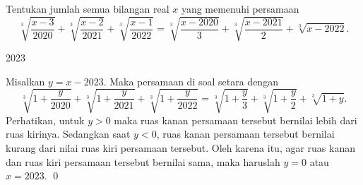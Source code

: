 \documentclass[11pt]{scrartcl}
\begin{document}
	\begin{soaljawab}
		Tentukan jumlah semua bilangan real $x$ yang memenuhi persamaan $$\sqrt[3]{\frac{x-3}{2020}}+\sqrt[3]{\frac{x-2}{2021}}+\sqrt[3]{\frac{x-1}{2022}}=\sqrt[3]{\frac{x-2020}{3}}+\sqrt[3]{\frac{x-2021}{2}}+\sqrt[3]{x-2022}.$$
		
		\begin{jawaban}
		2023
		\end{jawaban}
		\begin{solusi}
		Misalkan $y=x-2023$. Maka persamaan di soal setara dengan 
		$$\sqrt[3]{1+\frac{y}{2020}}+\sqrt[3]{1+\frac{y}{2021}}+\sqrt[3]{1+\frac{y}{2022}}=\sqrt[3]{1+\frac{y}{3}}+\sqrt[3]{1+\frac{y}{2}}+\sqrt[3]{1+y}.$$
		Perhatikan, untuk $y>0$ maka ruas kanan persamaan tersebut bernilai lebih dari ruas kirinya. Sedangkan saat $y<0$, ruas kanan persamaan tersebut bernilai kurang dari nilai ruas kiri persamaan tersebut. Oleh karena itu, agar ruas kanan dan ruas kiri persamaan tersebut bernilai sama, maka haruslah $y=0$ atau $x=2023$. \qed
		\end{solusi}
	\end{soaljawab}
	
\end{document}
